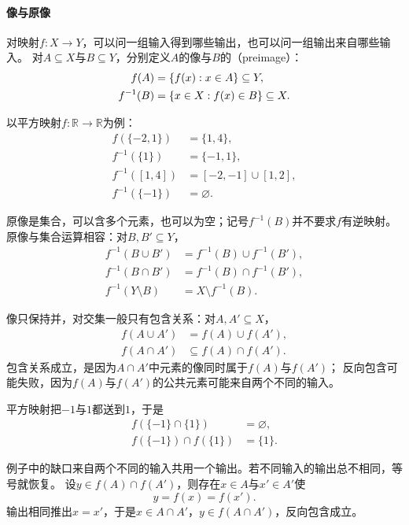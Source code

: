 \paragraph{像与原像}
对映射$f:X\to Y$，可以问一组输入得到哪些输出，也可以问一组输出来自哪些输入。
对$A\subseteq X$与$B\subseteq Y$，分别定义$A$的像与$B$的（preimage）：
\begin{align}
 f(A)&=\{f(x):x\in A\}\subseteq Y,\notag\\
 f^{-1}(B)&=\{x\in X:f(x)\in B\}\subseteq X.
 \label{eq:prelim-preimage}
\end{align}

以平方映射$f:\mathbb R\to\mathbb R$为例：
\begin{align*}
 f(\{-2,1\})&=\{1,4\},\\
 f^{-1}(\{1\})&=\{-1,1\},\\
 f^{-1}([1,4])&=[-2,-1]\cup[1,2],\\
 f^{-1}(\{-1\})&=\varnothing.
\end{align*}

原像是集合，可以含多个元素，也可以为空；记号$f^{-1}(B)$并不要求$f$有逆映射。
原像与集合运算相容：对$B,B'\subseteq Y$，
\begin{align*}
 f^{-1}(B\cup B')&=f^{-1}(B)\cup f^{-1}(B'),\\
 f^{-1}(B\cap B')&=f^{-1}(B)\cap f^{-1}(B'),\\
 f^{-1}(Y\setminus B)&=X\setminus f^{-1}(B).
\end{align*}

像只保持并，对交集一般只有包含关系：对$A,A'\subseteq X$，
\begin{align*}
 f(A\cup A')&=f(A)\cup f(A'),\\
 f(A\cap A')&\subseteq f(A)\cap f(A').
\end{align*}
包含关系成立，是因为$A\cap A'$中元素的像同时属于$f(A)$与$f(A')$；
反向包含可能失败，因为$f(A)$与$f(A')$的公共元素可能来自两个不同的输入。
\begin{example}[不保持交集的映射]
\label{ex:sets-image-intersection}
平方映射把$-1$与$1$都送到$1$，于是
\begin{align*}
 f(\{-1\}\cap\{1\})&=\varnothing,\\
 f(\{-1\})\cap f(\{1\})&=\{1\}.
\end{align*}
\end{example}
例子中的缺口来自两个不同的输入共用一个输出。若不同输入的输出总不相同，等号就恢复。
设$y\in f(A)\cap f(A')$，则存在$x\in A$与$x'\in A'$使
\[
 y=f(x)=f(x').
\]
输出相同推出$x=x'$，于是$x\in A\cap A'$，$y\in f(A\cap A')$，反向包含成立。

